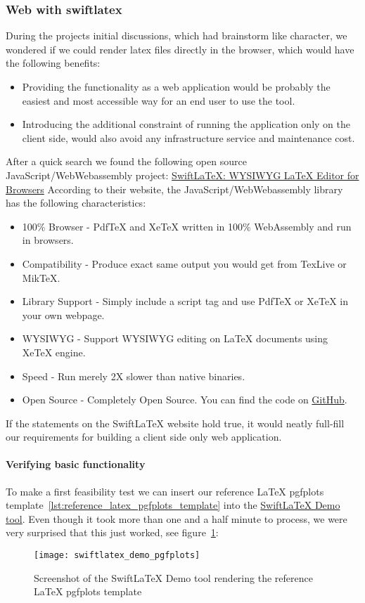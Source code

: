 \subsubsection{Web with swiftlatex}
During the projects initial discussions, which had brainstorm like character, we wondered if we could render latex files directly in the browser, which would have the following benefits:
\begin{itemize}
    \item Providing the functionality as a web application would be probably the easiest and most accessible way for an end user to use the tool.
    \item Introducing the additional constraint of running the application only on the client side, would also avoid any infrastructure service and maintenance cost.
\end{itemize}
After a quick search we found the following open source JavaScript/WebWebassembly project: \href{https://www.swiftlatex.com/}{SwiftLaTeX: WYSIWYG LaTeX Editor for Browsers}
According to their website, the JavaScript/WebWebassembly library has the following characteristics:~\cite{swiftlatex_website}
\begin{itemize}
    \item 100\% Browser - PdfTeX and XeTeX written in 100\% WebAssembly and run in browsers.
    \item Compatibility - Produce exact same output you would get from TexLive or MikTeX\@.
    \item Library Support - Simply include a script tag and use PdfTeX or XeTeX in your own webpage.
    \item WYSIWYG - Support WYSIWYG editing on LaTeX documents using XeTeX engine.
    \item Speed - Run merely 2X slower than native binaries.
    \item Open Source - Completely Open Source. You can find the code on \href{https://github.com/SwiftLaTeX/SwiftLaTeX/}{GitHub}.
\end{itemize}
If the statements on the SwiftLaTeX website hold true, it would neatly full-fill our requirements for building a client side only web application.

\paragraph{Verifying basic functionality}\mbox{}\newline
To make a first feasibility test we can insert our reference LaTeX pgfplots template~\ref{lst:reference_latex_pgfplots_template} into the \href{https://www.swiftlatex.com/\#demo}{SwiftLaTeX Demo tool}.
Even though it took more than one and a half minute to process, we were very surprised that this just worked, see figure~\ref{fig:swiftlatex_demo_rendering_latex_pgfplots_template}:
\begin{figure}[H]
    \centering
    \texttt{[image: swiftlatex\_demo\_pgfplots]}
    \caption{Screenshot of the SwiftLaTeX Demo tool rendering the reference LaTeX pgfplots template}
    \label{fig:swiftlatex_demo_rendering_latex_pgfplots_template}
\end{figure}


